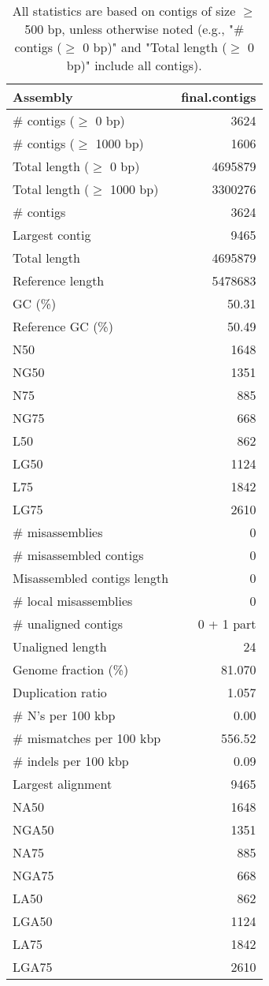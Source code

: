 \documentclass[12pt,a4paper]{article}
\begin{document}
\begin{table}[ht]
\begin{center}
\caption{All statistics are based on contigs of size $\geq$ 500 bp, unless otherwise noted (e.g., "\# contigs ($\geq$ 0 bp)" and "Total length ($\geq$ 0 bp)" include all contigs).}
\begin{tabular}{|l*{1}{|r}|}
\hline
Assembly & final.contigs \\ \hline
\# contigs ($\geq$ 0 bp) & 3624 \\ \hline
\# contigs ($\geq$ 1000 bp) & 1606 \\ \hline
Total length ($\geq$ 0 bp) & 4695879 \\ \hline
Total length ($\geq$ 1000 bp) & 3300276 \\ \hline
\# contigs & 3624 \\ \hline
Largest contig & 9465 \\ \hline
Total length & 4695879 \\ \hline
Reference length & 5478683 \\ \hline
GC (\%) & 50.31 \\ \hline
Reference GC (\%) & 50.49 \\ \hline
N50 & 1648 \\ \hline
NG50 & 1351 \\ \hline
N75 & 885 \\ \hline
NG75 & 668 \\ \hline
L50 & 862 \\ \hline
LG50 & 1124 \\ \hline
L75 & 1842 \\ \hline
LG75 & 2610 \\ \hline
\# misassemblies & 0 \\ \hline
\# misassembled contigs & 0 \\ \hline
Misassembled contigs length & 0 \\ \hline
\# local misassemblies & 0 \\ \hline
\# unaligned contigs & 0 + 1 part \\ \hline
Unaligned length & 24 \\ \hline
Genome fraction (\%) & 81.070 \\ \hline
Duplication ratio & 1.057 \\ \hline
\# N's per 100 kbp & 0.00 \\ \hline
\# mismatches per 100 kbp & 556.52 \\ \hline
\# indels per 100 kbp & 0.09 \\ \hline
Largest alignment & 9465 \\ \hline
NA50 & 1648 \\ \hline
NGA50 & 1351 \\ \hline
NA75 & 885 \\ \hline
NGA75 & 668 \\ \hline
LA50 & 862 \\ \hline
LGA50 & 1124 \\ \hline
LA75 & 1842 \\ \hline
LGA75 & 2610 \\ \hline
\end{tabular}
\end{center}
\end{table}
\end{document}
